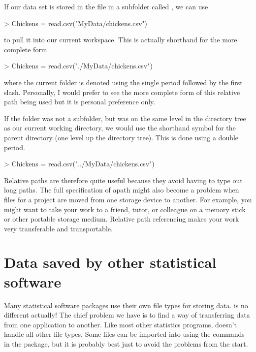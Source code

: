 If our data set is stored in the file  in a  subfolder called , we can use  
\begin{Schunk}
\begin{Sinput}
> Chickens = read.csv("MyData/chickens.csv") 
\end{Sinput}
\end{Schunk}
to pull it into our current workspace. This is actually shorthand for the more complete form 
\begin{Schunk}
\begin{Sinput}
> Chickens = read.csv("./MyData/chickens.csv") 
\end{Sinput}
\end{Schunk}
where the current folder is denoted using the single period followed by the first slash. Personally, I would prefer to see the more complete form of this relative path being used but it is personal preference only. 
 
If the  folder was not a subfolder, but was on the same level in the directory tree as our current working directory, we would use the shorthand symbol for the parent directory (one level up the directory tree). This is done using  a double period. 
\begin{Schunk}
\begin{Sinput}
> Chickens = read.csv("../MyData/chickens.csv") 
\end{Sinput}
\end{Schunk}
 
Relative paths are therefore quite useful because they avoid having to type out long paths. The full specification of apath might also become a problem when files for a project are moved from one storage device to another. For example, you might want to take your work to a friend, tutor, or colleague on a  memory stick or other portable storage medium. Relative path referencing makes your work very transferable and transportable. 
 
 
 
 
 
 
\section{Data saved by other statistical software} 
 
Many statistical software packages use their own file types for storing data. \R{} is no different actually! The chief problem we have is to find a way of transferring data from one application to another. Like most other statistics programs, \R{} doesn't handle all other file types. Some files can be imported into \R{} using the commands in the  package, but it is probably best just to avoid the problems from the start. 
 
